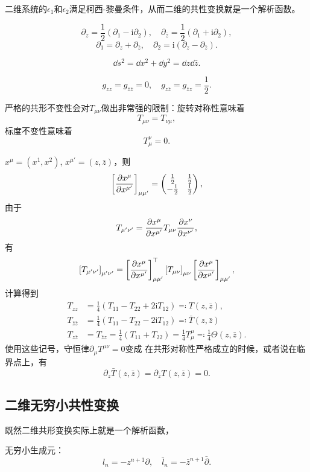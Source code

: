 \documentclass[hyperref, UTF8, a4paper]{ctexart}
\newcommand*{\ii}{\mathrm{i}}
\begin{document}
二维系统的$\epsilon_1$和$\epsilon_2$满足柯西-黎曼条件，从而二维的共性变换就是一个解析函数。

\begin{equation}
    \partial_z = \frac{1}{2} (\partial_1 - \ii \partial_2), \quad \partial_{\bar{z}} = \frac{1}{2} (\partial_1 + \ii \partial_2),
\end{equation}
\begin{equation}
    \partial_1 = \partial_z + \partial_{\bar{z}}, \quad \partial_2 = \ii (\partial_z - \partial_{\bar{z}}).
\end{equation}

\begin{equation}
    \dd{s^2} = \dd{x^2} + \dd{y^2} = \dd{z} \dd{\bar{z}}.
\end{equation}

\begin{equation}
    g_{zz} = g_{\bar{z} \bar{z}} = 0, \quad g_{z \bar{z}} = g_{\bar{z} z} = \frac{1}{2}.
\end{equation}

严格的共形不变性会对$T_{\mu \nu}$做出非常强的限制：旋转对称性意味着
\begin{equation}
    T_{\mu \nu} = T_{\nu \mu},
\end{equation}
标度不变性意味着
\begin{equation}
    T_{\mu}^\nu = 0.
\end{equation}

$x^\mu = (x^1, x^2)$, $x^{\mu'} = (z, \bar{z})$，则
\[
    \left[\pdv{x^\mu}{x^{\mu'}}\right]_{\mu \mu'} = \pmqty{\frac{1}{2} & \frac{1}{2} \\ - \frac{\ii}{2} & \frac{\ii}{2}},
\]
由于
\[
    T_{\mu' \nu'} = \pdv{x^\mu}{x^{\mu'}} T_{\mu \nu} \pdv{x^\nu}{x^{\nu'}},
\]
有
\[
    \left[T_{\mu' \nu'}\right]_{\mu' \nu'} = \left[\pdv{x^\mu}{x^{\mu'}}\right]_{\mu \mu'}^\top \left[T_{\mu \nu}\right]_{\mu \nu} \left[\pdv{x^\mu}{x^{\mu'}}\right]_{\mu \mu'},
\]
计算得到
\begin{equation}
    \begin{aligned}
        T_{zz} &= \frac{1}{4} (T_{11} - T_{22} + 2\ii T_{12}) \eqqcolon T(z, \bar{z}) , \\
        T_{\bar{z} \bar{z}} &= \frac{1}{4} (T_{11} - T_{22} - 2\ii T_{12}) \eqqcolon \bar{T}(z, \bar{z}) \\
        T_{z \bar{z}} &= T_{\bar{z} z} = \frac{1}{4} (T_{11} + T_{22}) = \frac{1}{4} T_\mu^\mu \eqqcolon \frac{1}{4} \Theta(z, \bar{z}).
    \end{aligned}
\end{equation}
使用这些记号，守恒律$\partial_\mu T^{\mu \nu} = 0$变成
在共形对称性严格成立的时候，或者说在临界点上，有
\begin{equation}
    \partial_z \bar{T}(z, \bar{z}) = \partial_{\bar{z}} T(z, \bar{z}) = 0.
\end{equation}

\subsection{二维无穷小共性变换}

既然二维共形变换实际上就是一个解析函数，

无穷小生成元：
\begin{equation}
    l_n = - z^{n+1} \partial, \quad \bar{l}_n = - \bar{z}^{n+1} \bar{\partial}.
\end{equation}
\end{document}
